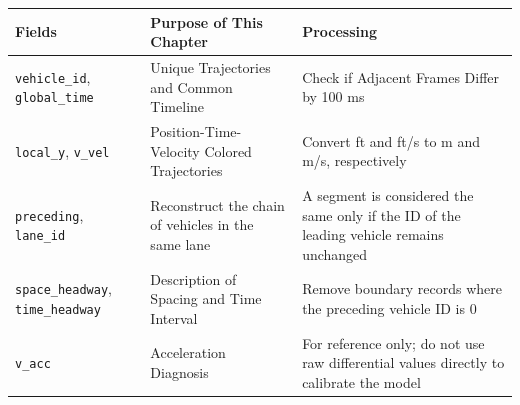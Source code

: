 \documentclass[11pt,a4paper,openany]{book}
\numberwithin{equation}{chapter}
\numberwithin{figure}{chapter}
\numberwithin{table}{chapter}
\begin{document}
\begin{center}
\small
{}
\label{tab:ngsim-fields}
\begin{tabular}{p{3.2cm}p{4.8cm}p{5.4cm}}
\toprule
\textbf{Fields} & \textbf{Purpose of This Chapter} & \textbf{Processing} \\
\midrule
\texttt{vehicle\_id}, \texttt{global\_time} &




 Unique Trajectories and Common Timeline




&




Check if Adjacent Frames Differ by 100 ms



\\
\texttt{local\_y}, \texttt{v\_vel} &




Position-Time-Velocity Colored Trajectories




&




 Convert ft and ft/s to m and m/s, respectively



\\
\texttt{preceding}, \texttt{lane\_id} &




 Reconstruct the chain of vehicles in the same lane




&




 A segment is considered the same only if the ID of the leading vehicle remains unchanged



\\
\texttt{space\_headway}, \texttt{time\_headway} &




 Description of Spacing and Time Interval& Remove boundary records where the preceding vehicle ID is 0



\\
\texttt{v\_acc} &




Acceleration Diagnosis




&




For reference only; do not use raw differential values directly to calibrate the model



\\
\bottomrule
\end{tabular}
\end{center}
\end{document}
